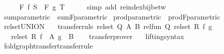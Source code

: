 \begin{isabellebody}
\ \ \isamarkupfalse%
\ \isamarkupfalse%
\ {\isachardoublequoteopen}F\ f\ S\ {\isacharequal}{\kern0pt}\ F\ g\ T{\isachardoublequoteclose}\isanewline
\ \ \ \ \isamarkupfalse%
\ {\isacharparenleft}{\kern0pt}simp\ add{\isacharcolon}{\kern0pt}\ reindex{\isacharunderscore}{\kern0pt}bij{\isacharunderscore}{\kern0pt}betw{\isacharparenright}{\kern0pt}\isanewline
{}\isamarkupfalse%
%
\endisatagproof
{\isafoldproof}%
%
\isadelimproof
\isanewline
%
\endisadelimproof
\isanewline
{}\isamarkupfalse%
\ sum{\isacharunderscore}{\kern0pt}parametric\ {\isacharequal}{\kern0pt}\ sum{\isachardot}{\kern0pt}F{\isacharunderscore}{\kern0pt}parametric\isanewline
{}\isamarkupfalse%
\ prod{\isacharunderscore}{\kern0pt}parametric\ {\isacharequal}{\kern0pt}\ prod{\isachardot}{\kern0pt}F{\isacharunderscore}{\kern0pt}parametric\isanewline
\isanewline
{}\isamarkupfalse%
\ rel{\isacharunderscore}{\kern0pt}set{\isacharunderscore}{\kern0pt}UNION{\isacharcolon}{\kern0pt}\isanewline
\ \ \ {\isacharbrackleft}{\kern0pt}transfer{\isacharunderscore}{\kern0pt}rule{\isacharbrackright}{\kern0pt}{\isacharcolon}{\kern0pt}\ {\isachardoublequoteopen}rel{\isacharunderscore}{\kern0pt}set\ Q\ A\ B{\isachardoublequoteclose}\ {\isachardoublequoteopen}rel{\isacharunderscore}{\kern0pt}fun\ Q\ {\isacharparenleft}{\kern0pt}rel{\isacharunderscore}{\kern0pt}set\ R{\isacharparenright}{\kern0pt}\ f\ g{\isachardoublequoteclose}\isanewline
\ \ \ {\isachardoublequoteopen}rel{\isacharunderscore}{\kern0pt}set\ R\ {\isacharparenleft}{\kern0pt}{\isasymUnion}{\isacharparenleft}{\kern0pt}f\ {\isacharbackquote}{\kern0pt}\ A{\isacharparenright}{\kern0pt}{\isacharparenright}{\kern0pt}\ {\isacharparenleft}{\kern0pt}{\isasymUnion}{\isacharparenleft}{\kern0pt}g\ {\isacharbackquote}{\kern0pt}\ B{\isacharparenright}{\kern0pt}{\isacharparenright}{\kern0pt}{\isachardoublequoteclose}\isanewline
%
\isadelimproof
\ \ %
\endisadelimproof
%
\isatagproof
{}\isamarkupfalse%
\ transfer{\isacharunderscore}{\kern0pt}prover%
\endisatagproof
{\isafoldproof}%
%
\isadelimproof
\isanewline
%
\endisadelimproof
\isanewline
{}\isamarkupfalse%
\isanewline
\ \ \ lifting{\isacharunderscore}{\kern0pt}syntax\isanewline
{}\isanewline
\isanewline
{}\isamarkupfalse%
\ fold{\isacharunderscore}{\kern0pt}graph{\isacharunderscore}{\kern0pt}transfer{\isacharbrackleft}{\kern0pt}transfer{\isacharunderscore}{\kern0pt}rule{\isacharbrackright}{\kern0pt}{\isacharcolon}{\kern0pt}\isanewline

\end{isabellebody}
